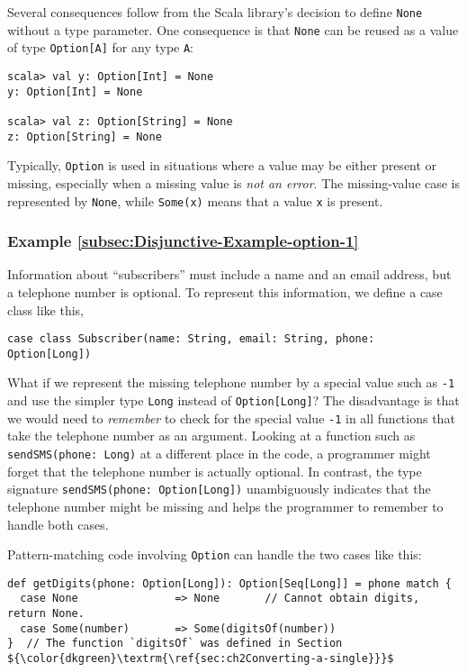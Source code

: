 Several consequences follow from the Scala library\textsf{'}s decision to define
\lstinline!None! without a type parameter. One consequence is that
\lstinline!None! can be reused as a value of type \lstinline!Option[A]!
for any type \lstinline!A!:
\begin{lstlisting}
scala> val y: Option[Int] = None
y: Option[Int] = None

scala> val z: Option[String] = None
z: Option[String] = None
\end{lstlisting}

Typically, \lstinline!Option! is used in situations where a value
may be either present or missing, especially when a missing value
is \emph{not an error}. The missing-value case is represented by \lstinline!None!,
while \lstinline!Some(x)! means that a value \lstinline!x! is present.

\subsubsection{Example \label{subsec:Disjunctive-Example-option-1}\ref{subsec:Disjunctive-Example-option-1}}

Information about \textsf{``}subscribers\textsf{''} must include a name and an email
address, but a telephone number is optional. To represent this information,
we define a case class like this,
\begin{lstlisting}
case class Subscriber(name: String, email: String, phone: Option[Long])
\end{lstlisting}
What if we represent the missing telephone number by a special value
such as \lstinline!-1! and use the simpler type \lstinline!Long!
instead of \lstinline!Option[Long]!? The disadvantage is that we
would need to \emph{remember} to check for the special value \lstinline!-1!
in all functions that take the telephone number as an argument. Looking
at a function such as \lstinline!sendSMS(phone: Long)! at a different
place in the code, a programmer might forget that the telephone number
is actually optional. In contrast, the type signature \lstinline!sendSMS(phone: Option[Long])!
unambiguously indicates that the telephone number might be missing
and helps the programmer to remember to handle both cases.

Pattern-matching code involving \lstinline!Option! can handle the
two cases like this:
\begin{lstlisting}[mathescape=true]
def getDigits(phone: Option[Long]): Option[Seq[Long]] = phone match {
  case None               => None       // Cannot obtain digits, return None.
  case Some(number)       => Some(digitsOf(number))
}  // The function `digitsOf` was defined in Section ${\color{dkgreen}\textrm{\ref{sec:ch2Converting-a-single}}}$
\end{lstlisting}

